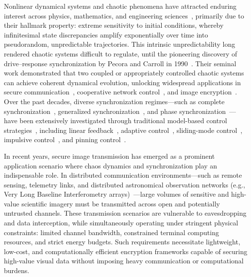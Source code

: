 \documentclass[a4paper,fleqn]{cas-sc}
\theoremstyle{plain}
\theoremstyle{definition}
\begin{document}
Nonlinear dynamical systems and chaotic phenomena have attracted enduring interest across physics, mathematics, and engineering sciences~\cite{strogatz2018nonlinear,boccaletti2006complex,izhikevich2007dynamical}, primarily due to their hallmark property: extreme sensitivity to initial conditions, whereby infinitesimal state discrepancies amplify exponentially over time into pseudorandom, unpredictable trajectories. This intrinsic unpredictability long rendered chaotic systems difficult to regulate, until the pioneering discovery of drive--response synchronization by Pecora and Carroll in 1990~\cite{pecora1990synchronization}. Their seminal work demonstrated that two coupled or appropriately controlled chaotic systems can achieve coherent dynamical evolution, unlocking widespread applications in secure communication~\cite{koronovskii2010on,argyris2005chaos,vanwiggeren1998communication}, cooperative network control~\cite{wen2021coordination,olfati2007consensus}, and image encryption~\cite{zia2022survey,xu2014image}. Over the past decades, diverse synchronization regimes—such as complete synchronization~\cite{lin2005complete}, generalized synchronization~\cite{kocarev1996generalized}, and phase synchronization~\cite{guan2005phase}—have been extensively investigated through traditional model-based control strategies~\cite{ott1990controlling,boccaletti2000control}, including linear feedback~\cite{yassen2005controlling}, adaptive control~\cite{wang2003feedback}, sliding-mode control~\cite{feki2009sliding,su2021fixed,mobayen2018chaos}, impulsive control~\cite{li2005impulsive}, and pinning control~\cite{chen2014pinning}.

In recent years, secure image transmission has emerged as a prominent application scenario where chaos dynamics and synchronization play an indispensable role. In distributed communication environments—such as remote sensing, telemetry links, and distributed astronomical observation networks (e.g., Very Long Baseline Interferometry arrays)~\cite{thompson2017interferometry}—large volumes of sensitive and high-value scientific imagery must be transmitted across open and potentially untrusted channels. These transmission scenarios are vulnerable to eavesdropping and data interception, while simultaneously operating under stringent physical constraints: limited channel bandwidth, constrained terminal computing resources, and strict energy budgets. Such requirements necessitate lightweight, low-cost, and computationally efficient encryption frameworks capable of securing high-value visual data without imposing heavy communication or computational burdens.
\end{document}
